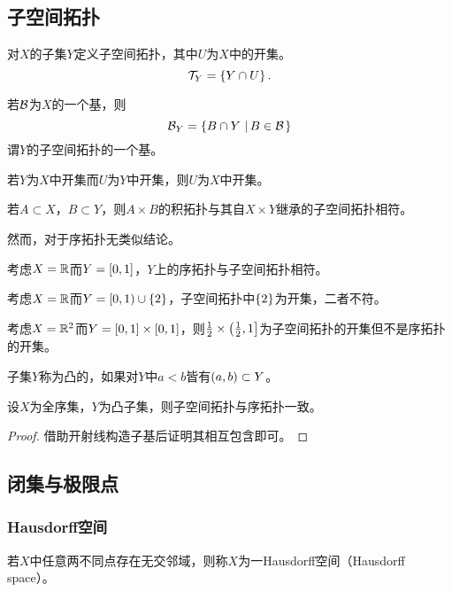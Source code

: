 \documentclass{ctexrep}
\begin{document}
  \subsection{子空间拓扑}
  \begin{definition}
  对$X$的子集$Y$定义子空间拓扑，其中$U$为$X$中的开集。
  \[ \mathcal{T}_Y = \left\{Y\cap U\right\}. \]
  \end{definition}
  \begin{theorem}
  若$\mathcal{B}$为$X$的一个基，则
  \[ \mathcal{B}_Y = \left\{B\cap Y \, \left| \, B \in \mathcal{B} \right.\right\} \]
  谓$Y$的子空间拓扑的一个基。
  \end{theorem}
  \begin{lemma}
  若$Y$为$X$中开集而$U$为$Y$中开集，则$U$为$X$中开集。
  \end{lemma}
  \begin{theorem}
  若$A\subset X$，$B\subset Y$，则$A\times B$的积拓扑与其自$X\times Y$继承的子空间拓扑相符。
  \end{theorem}
  然而，对于序拓扑无类似结论。
  \begin{ex}
  考虑$X=\mathbb{R}$而$Y=\left[0,1\right]$，$Y$上的序拓扑与子空间拓扑相符。
  \end{ex}
  \begin{ex}
  考虑$X=\mathbb{R}$而$Y=\left[0,1\right)\cup\left\{2\right\}$，子空间拓扑中$\left\{2\right\}$为开集，二者不符。
  \end{ex}
  \begin{ex}
  考虑$X=\mathbb{R}^2$而$Y=\left[0,1\right]\times\left[0,1\right]$，则$\frac{1}{2}\times\left(\frac{1}{2},1\right]$为子空间拓扑的开集但不是序拓扑的开集。
  \end{ex}
  \begin{definition}
  子集$Y$称为凸的，如果对$Y$中$a<b$皆有$\left(a,b\right)\subset Y$。
  \end{definition}
  \begin{theorem}
  设$X$为全序集，$Y$为凸子集，则子空间拓扑与序拓扑一致。
  \end{theorem}
  \begin{proof}
  借助开射线构造子基后证明其相互包含即可。
  \end{proof}
  \subsection{闭集与极限点}
  \subsubsection{Hausdorff空间}
  \begin{definition}
    若$X$中任意两不同点存在无交邻域，则称$X$为一Hausdorff空间（Hausdorff space）。
  \end{definition}
\end{document}
